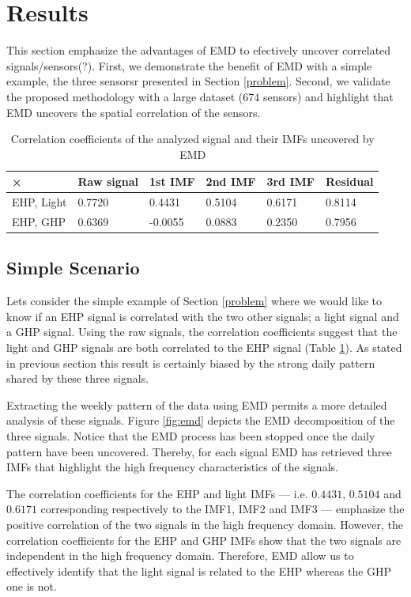 \section{Results}
This section emphasize the advantages of EMD to efectively uncover correlated signals/sensors(?).
First, we demonstrate the benefit of EMD with a simple example, the three sensorsr presented in Section \ref{problem}.
Second, we validate the proposed methodology with a large dataset (674 sensors) and highlight that EMD uncovers the spatial correlation of the sensors.

\begin{table}
\begin{center}
\begin{tabular}{|l|l|l|l|l|l|}
\hline
× & Raw signal & 1st IMF & 2nd IMF & 3rd IMF & Residual\\ \hline
EHP, Light & 0.7720 & 0.4431 & 0.5104 & 0.6171 & 0.8114\\ \hline
EHP, GHP & 0.6369 & -0.0055 & 0.0883 & 0.2350 & 0.7956\\ \hline
\end{tabular}
\caption{Correlation coefficients of the analyzed signal and their IMFs uncovered by EMD}
\label{tab:corr}
\end{center}
\end{table}
\subsection{Simple Scenario}

Lets consider the simple example of Section \ref{problem} where we would like to know if an EHP signal is correlated with the two other signals; a light signal and a GHP signal.
Using the raw signals, the correlation coefficients suggest that the light and GHP signals are both correlated to the EHP signal (Table \ref{tab:corr}).
As stated in previous section this result is certainly biased by the strong daily pattern shared by these three signals.

Extracting the weekly pattern of the data using EMD permits a more detailed analysis of these signals.
Figure \ref{fig:emd} depicts the EMD decomposition of the three signals.
Notice that the EMD process has been stopped once the daily pattern have been uncovered.
Thereby, for each signal EMD has retrieved three IMFs that highlight the high frequency characteristics of the signals.

The correlation coefficients for the EHP and light IMFs --- i.e. $0.4431$, $0.5104$ and $0.6171$ corresponding respectively to the IMF1, IMF2 and IMF3 --- emphasize the positive correlation of the two signals in the high frequency domain.
However, the correlation coefficients for the EHP and GHP IMFs show that the two signals are independent in the high frequency domain.
Therefore, EMD allow us to effectively identify that the light signal is related to the EHP whereas the GHP one is not.

